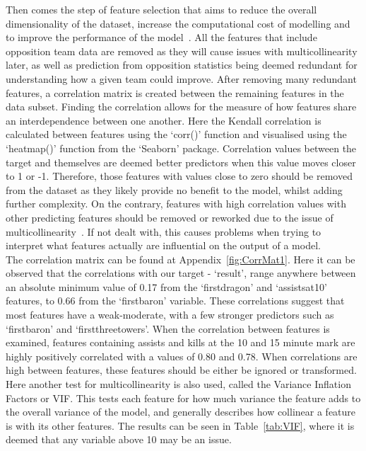 Then comes the step of feature selection that aims to reduce the overall dimensionality of the dataset, increase the computational cost of modelling and to improve the performance of the model~\citep{brownlee2019choose}.
All the features that include opposition team data are removed as they will cause issues with multicollinearity later, as well as prediction from opposition statistics being deemed redundant for understanding how a given team could improve.
After removing many redundant features, a correlation matrix is created between the remaining features in the data subset.
Finding the correlation allows for the measure of how features share an interdependence between one another.
Here the Kendall correlation is calculated between features using the `corr()' function and visualised using the `heatmap()' function from the `Seaborn' package.
Correlation values between the target and themselves are deemed better predictors when this value moves closer to 1 or -1.
Therefore, those features with values close to zero should be removed from the dataset as they likely provide no benefit to the model, whilst adding further complexity.
On the contrary, features with high correlation values with other predicting features should be removed or reworked due to the issue of multicollinearity~\citep{alin2010multicollinearity}.
If not dealt with, this causes problems when trying to interpret what features actually are influential on the output of a model.  \\

The correlation matrix can be found at Appendix~\ref{fig:CorrMat1}.
Here it can be observed that the correlations with our target - `result', range anywhere between an absolute minimum value of 0.17 from the `firstdragon' and `assistsat10' features, to 0.66 from the `firstbaron' variable.
These correlations suggest that most features have a weak-moderate, with a few stronger predictors such as `firstbaron' and `firstthreetowers'.
When the correlation between features is examined, features containing assists and kills at the 10 and 15 minute mark are highly positively correlated with a values of 0.80 and 0.78.
When correlations are high between features, these features should be either be ignored or transformed.
Here another test for multicollinearity is also used, called the Variance Inflation Factors or VIF\@.
This tests each feature for how much variance the feature adds to the overall variance of the model, and generally describes how collinear a feature is with its other features.
The results can be seen in Table~\ref{tab:VIF}, where it is deemed that any variable above 10 may be an issue.

